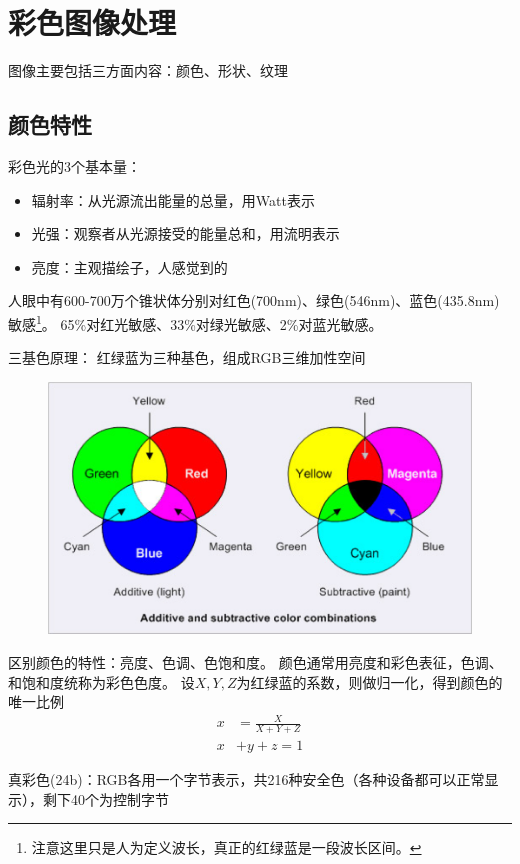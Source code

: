 
\section{彩色图像处理} %
图像主要包括三方面内容：颜色、形状、纹理

\subsection{颜色特性}
彩色光的3个基本量：
\begin{itemize}
	\item 辐射率：从光源流出能量的总量，用Watt表示
	\item 光强：观察者从光源接受的能量总和，用流明表示
	\item 亮度：主观描绘子，人感觉到的
\end{itemize}

人眼中有600-700万个锥状体分别对红色(700nm)、绿色(546nm)、蓝色(435.8nm)敏感\footnote{注意这里只是人为定义波长，真正的红绿蓝是一段波长区间。}。
65\%对红光敏感、33\%对绿光敏感、2\%对蓝光敏感。

三基色原理：
红绿蓝为三种基色，组成RGB三维加性空间
\begin{figure}[H]
\centering
\includegraphics[width=0.8\linewidth]{fig/rgb_and_cmyk.png}
\end{figure}

区别颜色的特性：亮度、色调、色饱和度。
颜色通常用亮度和彩色表征，色调、和饱和度统称为彩色色度。
设$X,Y,Z$为红绿蓝的系数，则做归一化，得到颜色的唯一比例
\[\begin{aligned}
x&=\frac{X}{X+Y+Z}\\
x&+y+z=1
\end{aligned}\]

真彩色(24b)：RGB各用一个字节表示，共216种安全色（各种设备都可以正常显示），剩下40个为控制字节

